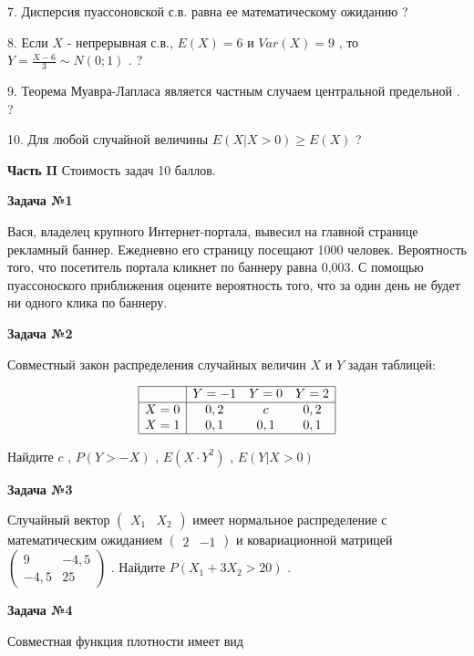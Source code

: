 \documentclass[pdftex,12pt,a4paper]{article}
\begin{document}
7. Дисперсия пуассоновской с.в. равна ее математическому ожиданию ?

8. Если  $X$  - непрерывная с.в.,  $E\left(X\right)=6$  и  $Var\left(X\right)=9$ , то  $Y=\frac{X-6}{3} \sim N\left(0;1\right)$ . ?

9. Теорема Муавра-Лапласа является частным случаем центральной предельной . ?

10. Для любой случайной величины  $E\left(X|X>0\right)\ge E\left(X\right)$  ?

{\bf Часть }{\bf II} Стоимость задач 10 баллов.

{\bf Задача №1}

Вася, владелец крупного Интернет-портала, вывесил на главной странице рекламный баннер. Ежедневно его страницу посещают 1000 человек. Вероятность того, что посетитель портала кликнет по баннеру равна 0,003. С помощью пуассоноского приближения оцените вероятность того, что за один день не будет ни одного клика по баннеру.

{\bf Задача №2}

Совместный закон распределения случайных величин  $X$  и  $Y$  задан таблицей:

$$\begin{array}{|c|ccc|}  \hline {} & {Y=-1} & {Y=0} & {Y=2} \\  \hline {X=0} & {0,2} & {c} & {0,2} \\ {X=1} & {0,1} & {0,1} & {0,1} \\  \hline  \end{array}$$

Найдите  $c$ ,  $P\left(Y>-X\right)$ ,  $E\left(X\cdot Y^{2} \right)$ ,  $E\left(Y|X>0\right)$ 

{\bf Задача №3}

Случайный вектор  $\left(\begin{array}{cc} {X_{1} } & {X_{2} } \end{array}\right)$  имеет нормальное распределение с математическим ожиданием  $\left(\begin{array}{cc} {2} & {-1} \end{array}\right)$  и ковариационной матрицей  $\left(\begin{array}{cc} {9} & {-4,5} \\ {-4,5} & {25} \end{array}\right)$ . Найдите  $P\left(X_{1} +3X_{2} >20\right)$ .

{\bf Задача №4}

Совместная функция плотности имеет вид
\end{document}
